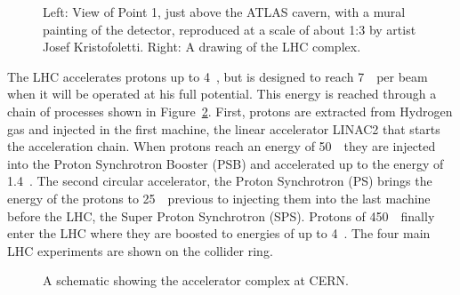 \begin{figure}[tb]\begin{center}
	\caption[bla]{Left: View of Point 1, just above the ATLAS cavern, with a mural painting 
        of the detector, reproduced at a scale of about 1:3
        by artist Josef Kristofoletti\footnotemark.
        Right: A drawing of the LHC complex.\label{fig:nicepics}}
\end{center}\end{figure}


The LHC accelerates protons up to 4~\tev, but is designed to reach 7~\tev\ per beam
when it will be operated at his full potential. This energy is reached 
through a chain of processes shown in Figure~\ref{fig:lhcring}.
First, protons are extracted from Hydrogen gas and injected in the first machine, the linear 
accelerator LINAC2 that starts the acceleration chain. When protons reach
an energy of 50~\mev\ they are injected into the Proton Synchrotron Booster
(PSB) and accelerated up to the energy of 1.4~\gev. The second circular
accelerator, the Proton Synchrotron (PS) brings the energy of the protons
to 25~\gev\ previous to injecting them into the last machine before the LHC,
the Super Proton Synchrotron (SPS). Protons of 450~\gev\ finally enter the
LHC where they are boosted to energies of up to 4~\tev.
The four main LHC experiments are shown on the collider ring.

\begin{figure}[tb]\begin{center}
	\caption{A schematic showing the accelerator complex at CERN.\label{fig:lhcring}}
\end{center}\end{figure}


